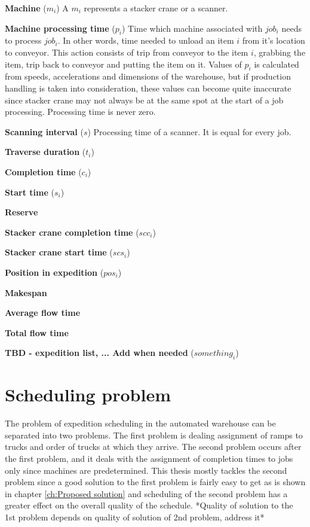 \documentclass{ctuthesis}
\begin{document}
\noindent \textbf{Machine} ($m_i$) A $m_i$ represents a stacker crane or a scanner. 

\noindent \textbf{Machine processing time} ($p_i$) Time which machine associated with $job_i$ needs to process $job_i$. In other words, time needed to unload an item $i$ from it's location to conveyor. This action consists of trip from conveyor to the item $i$, grabbing the item, trip back to conveyor and putting the item on it. Values of $p_i$ is calculated from speeds, accelerations and dimensions of the warehouse, but if production handling is taken into consideration, these values can become quite inaccurate since stacker crane may not always be at the same spot at the start of a job processing. Processing time is never zero.


\noindent \textbf{Scanning interval} ($s$) Processing time of a scanner. It is equal for every job.

\noindent \textbf{Traverse duration} ($t_i$)

\noindent \textbf{Completion time} ($c_i$)

\noindent \textbf{Start time} ($s_i$)

\noindent \textbf{Reserve}

\noindent \textbf{Stacker crane completion time} ($scc_i$)

\noindent \textbf{Stacker crane start time} ($scs_i$)

\noindent \textbf{Position in expedition} ($pos_i$)

\noindent \textbf{Makespan}

\noindent \textbf{Average flow time}

\noindent \textbf{Total flow time}

\noindent \textbf{TBD - expedition list, ... Add when needed} ($something_i$)


\section{Scheduling problem}
 
 The problem of expedition scheduling in the automated warehouse can be separated into two problems. The first problem is dealing assignment of ramps to trucks and order of trucks at which they arrive. The second problem occurs after the first problem, and it deals with the assignment of completion times to jobs only since machines are predetermined. This thesis mostly tackles the second problem since a good solution to the first problem is fairly easy to get as is shown in chapter \ref{ch:Proposed solution} and scheduling of the second problem has a greater effect on the overall quality of the schedule. *Quality of solution to the 1st problem depends on quality of solution of 2nd problem, address it* 
 
\end{document}
